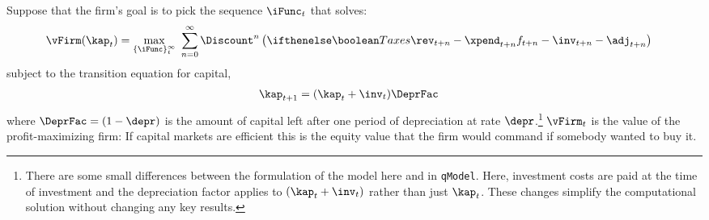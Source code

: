 Suppose that the firm's goal is to pick the sequence $\iFunc_{t}$ that solves:
\begin{equation}\begin{gathered}\begin{aligned}
  \vFirm(\kap_{t}) & =  \max_{\{\iFunc\}_{t}^{\infty}}~\sum_{n=0}^{\infty} \Discount^{n} \left(\ifTax{\rev_{t+n}-\xpend_{t+n}}{f_{t+n}-\inv_{t+n}-\adj_{t+n}}\right)
\end{aligned}\end{gathered}\end{equation}
subject to the transition equation for capital,
\begin{equation}\begin{gathered}\begin{aligned}
  \kap_{t+1} & =  (\kap_{t}+\inv_{t})\DeprFac \label{eq:kAccum}
\end{aligned}\end{gathered}\end{equation}
where $\DeprFac = (1-\depr)$ is the amount of capital left after one
period of depreciation at rate $\depr$.\footnote{There are some small
  differences between the formulation of the model here and in
  \texttt{qModel}.  Here, investment costs are paid at the time of
  investment and the depreciation factor applies to $(\kap_{t}+\inv_{t})$
  rather than just $\kap_{t}$. These changes simplify the computational
  solution without changing any key results.}  $\vFirm_{t}$ is the
value of the profit-maximizing firm: If capital markets are efficient
this is the equity value that the firm would command if somebody
wanted to buy it.

